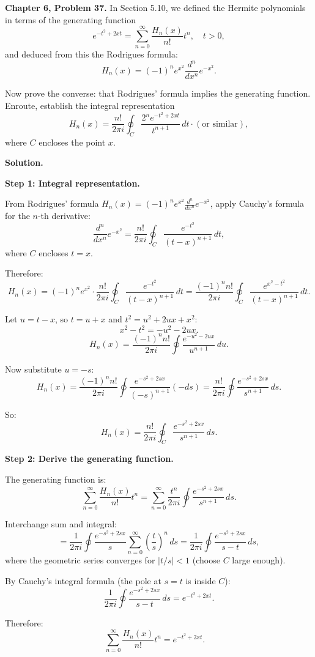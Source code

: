 \documentclass[12pt]{article}
\begin{document}
\textbf{Chapter 6, Problem 37.} In Section 5.10, we defined the Hermite polynomials in terms of the generating function
\[
e^{-t^2+2xt} = \sum_{n=0}^{\infty}\frac{H_n(x)}{n!}t^n, \quad t > 0,
\]
and deduced from this the Rodrigues formula:
\[
H_n(x) = (-1)^n e^{x^2}\frac{d^n}{dx^n}e^{-x^2}.
\]

Now prove the converse: that Rodrigues' formula implies the generating function. Enroute, establish the integral representation
\[
H_n(x) = \frac{n!}{2\pi i}\oint_C \frac{2^n e^{-t^2+2xt}}{t^{n+1}}\,dt \cdot (\text{or similar}),
\]
where $C$ encloses the point $x$.

\bigskip
\textbf{Solution.}

\textbf{Step 1: Integral representation.}

From Rodrigues' formula $H_n(x) = (-1)^ne^{x^2}\frac{d^n}{dx^n}e^{-x^2}$, apply Cauchy's formula for the $n$-th derivative:
\[
\frac{d^n}{dx^n}e^{-x^2} = \frac{n!}{2\pi i}\oint_C\frac{e^{-t^2}}{(t-x)^{n+1}}\,dt,
\]
where $C$ encloses $t = x$.

Therefore:
\[
H_n(x) = (-1)^ne^{x^2}\cdot\frac{n!}{2\pi i}\oint_C\frac{e^{-t^2}}{(t-x)^{n+1}}\,dt = \frac{(-1)^nn!}{2\pi i}\oint_C\frac{e^{x^2-t^2}}{(t-x)^{n+1}}\,dt.
\]

Let $u = t - x$, so $t = u + x$ and $t^2 = u^2+2ux+x^2$:
\[
x^2 - t^2 = -u^2 - 2ux.
\]
\[
H_n(x) = \frac{(-1)^nn!}{2\pi i}\oint\frac{e^{-u^2-2ux}}{u^{n+1}}\,du.
\]

Now substitute $u = -s$:
\[
H_n(x) = \frac{(-1)^nn!}{2\pi i}\oint\frac{e^{-s^2+2sx}}{(-s)^{n+1}}(-ds) = \frac{n!}{2\pi i}\oint\frac{e^{-s^2+2sx}}{s^{n+1}}\,ds.
\]

So:
\[
\boxed{H_n(x) = \frac{n!}{2\pi i}\oint_C\frac{e^{-s^2+2sx}}{s^{n+1}}\,ds.}
\]

\textbf{Step 2: Derive the generating function.}

The generating function is:
\[
\sum_{n=0}^{\infty}\frac{H_n(x)}{n!}t^n = \sum_{n=0}^{\infty}\frac{t^n}{2\pi i}\oint\frac{e^{-s^2+2sx}}{s^{n+1}}\,ds.
\]

Interchange sum and integral:
\[
= \frac{1}{2\pi i}\oint\frac{e^{-s^2+2sx}}{s}\sum_{n=0}^{\infty}\left(\frac{t}{s}\right)^n\,ds = \frac{1}{2\pi i}\oint\frac{e^{-s^2+2sx}}{s-t}\,ds,
\]
where the geometric series converges for $|t/s| < 1$ (choose $C$ large enough).

By Cauchy's integral formula (the pole at $s = t$ is inside $C$):
\[
\frac{1}{2\pi i}\oint\frac{e^{-s^2+2sx}}{s-t}\,ds = e^{-t^2+2xt}.
\]

Therefore:
\[
\sum_{n=0}^{\infty}\frac{H_n(x)}{n!}t^n = e^{-t^2+2xt}. \quad
\]
\end{document}
